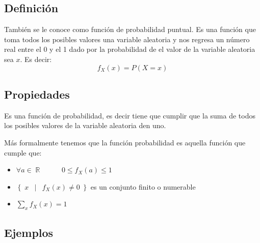 \documentclass[12pt, fleqn]{report}                             %
\DeclareMathOperator \Space     {\quad}                         %
\DeclareMathOperator \MegaSpace {\quad \quad}                   %
\DeclareMathOperator \MiniSpace {\;}                            %
\newcommand \Such           {\MiniSpace | \MiniSpace}           %
\theoremstyle{break}                                            %
\DeclareMathOperator \Reals        {\mathbb{R}}                 %
\newcommand{\Set}[1]            {\left\{ \; #1 \; \right\}}     %
\begin{document}
            \subsection{Definición}

                También se le conoce como función de probabilidad puntual.
                Es una función que toma todos los posibles valores una variable aleatoria y nos regresa un número
                real entre el 0 y el 1 dado por la probabilidad de el valor de la variable aleatoria sea $x$.
                Es decir:
                \begin{equation*}
                    f_X (x) = P(X = x)
                \end{equation*}


            \subsection{Propiedades}

                Es una función de probabilidad, es decir tiene que cumplir que la suma de todos los posibles
                valores de la variable aleatoria den uno.

                Más formalmente tenemos que la función probabilidad es aquella función que cumple que:
                \begin{itemize}
                    \item $\forall a \in \Reals \MegaSpace 0 \leq f_X(a) \leq 1$
                    \item $\Set{x \Such f_X(x) \neq 0}$ es un conjunto finito o numerable
                    \item $\displaystyle \sum_x f_X(x) = 1$
                \end{itemize}

            \clearpage
            \subsection{Ejemplos}
\end{document}
